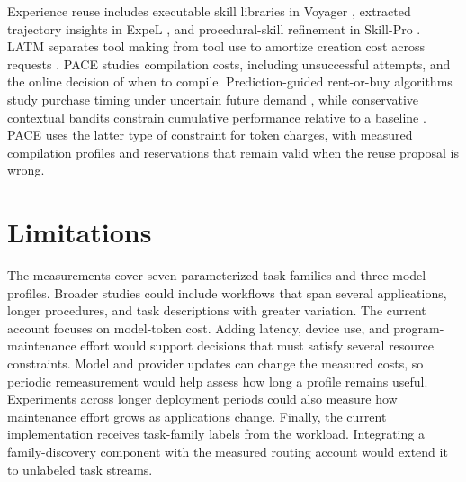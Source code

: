 Experience reuse includes executable skill libraries in Voyager \citep{wang2023voyager}, extracted trajectory insights in ExpeL \citep{zhao2023expel}, and procedural-skill refinement in Skill-Pro \citep{mi2026skillpro}.
LATM separates tool making from tool use to amortize creation cost across requests \citep{cai2023toolmakers}.
PACE studies compilation costs, including unsuccessful attempts, and the online decision of when to compile.
Prediction-guided rent-or-buy algorithms study purchase timing under uncertain future demand \citep{purohit2018improving,gollapudi2019online}, while conservative contextual bandits constrain cumulative performance relative to a baseline \citep{kazerouni2016conservative}.
PACE uses the latter type of constraint for token charges, with measured compilation profiles and reservations that remain valid when the reuse proposal is wrong.

\section{Limitations}
\label{sec:limitations}

The measurements cover seven parameterized task families and three model profiles.
Broader studies could include workflows that span several applications, longer procedures, and task descriptions with greater variation.
The current account focuses on model-token cost.
Adding latency, device use, and program-maintenance effort would support decisions that must satisfy several resource constraints.
Model and provider updates can change the measured costs, so periodic remeasurement would help assess how long a profile remains useful.
Experiments across longer deployment periods could also measure how maintenance effort grows as applications change.
Finally, the current implementation receives task-family labels from the workload.
Integrating a family-discovery component with the measured routing account would extend it to unlabeled task streams.


\FloatBarrier
\label{main:text-end}
\clearpage

\clearpage



\clearpage
\appendix
\raggedbottom
{}

